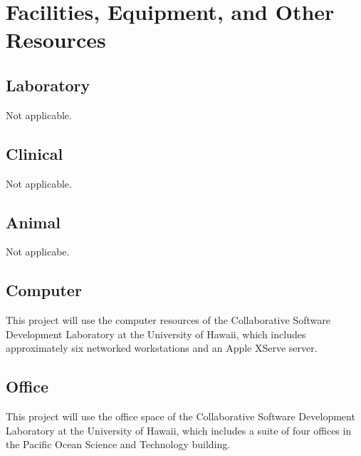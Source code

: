 
\section*{Facilities, Equipment, and Other Resources}


\subsection*{Laboratory}

Not applicable.

\subsection*{Clinical}

Not applicable.

\subsection*{Animal}

Not applicabe.

\subsection*{Computer}

This project will use the computer resources of the Collaborative Software
Development Laboratory at the University of Hawaii, which includes
approximately six networked workstations and an Apple XServe server.

\subsection*{Office}

This project will use the office space of the Collaborative Software
Development Laboratory at the University of Hawaii, which includes a suite
of four offices in the Pacific Ocean Science and Technology building.


